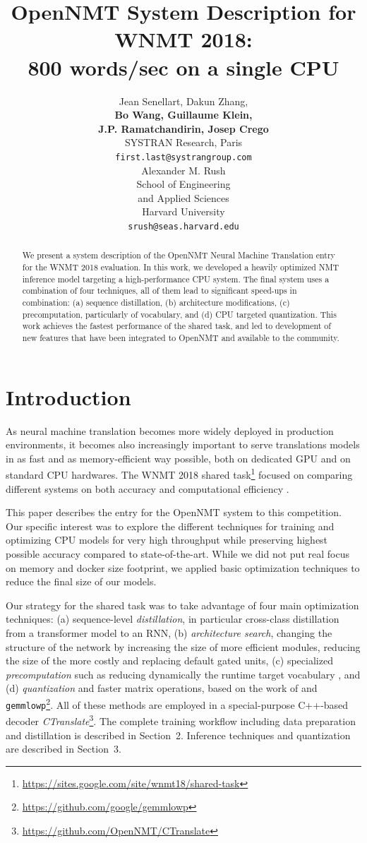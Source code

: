 \documentclass[11pt,a4paper]{article}
\title{OpenNMT System Description for WNMT 2018: \protect\\ 800 words/sec on a single CPU}
\author{Jean Senellart, Dakun Zhang, \\{\bf Bo Wang, Guillaume Klein,} \\{\bf J.P. Ramatchandirin, Josep Crego}\\
  SYSTRAN Research, Paris\\
  {\tt first.last@systrangroup.com} \\\And
  Alexander M. Rush\\
  School of Engineering \\
  and Applied Sciences \\
  Harvard University \\
  {\tt srush@seas.harvard.edu} \\}
\date{}
\begin{document}
\maketitle
\begin{abstract}

  We present a system description of the OpenNMT Neural Machine Translation entry for the WNMT 2018 evaluation.
  In this work, we developed a heavily optimized NMT inference model
  targeting a high-performance CPU system. The final system uses a
  combination of four techniques, all of them lead to significant
  speed-ups in combination: (a) sequence distillation, (b)
  architecture modifications, (c) precomputation, particularly of
  vocabulary, and (d) CPU targeted quantization. This work achieves the fastest performance of the shared task, and led to development of new features that have been integrated to OpenNMT and
  available to the community.

\end{abstract}

\section{Introduction}

As neural machine translation becomes more widely deployed in
production environments, it becomes also increasingly important to serve
translations models in as fast and as memory-efficient way possible,
both on dedicated GPU and on standard CPU hardwares. The
WNMT 2018 shared task\footnote{\url{https://sites.google.com/site/wnmt18/shared-task}}
focused on comparing different systems on both accuracy and
computational efficiency \cite{birch2018wnmt}.

This paper describes the entry for the OpenNMT system to this
competition.  Our specific interest was to explore the different
techniques for training and optimizing CPU models for very high throughput
while preserving highest possible accuracy compared to state-of-the-art. While we did not put real focus
on memory and docker size footprint, we applied basic optimization
techniques to reduce the final size of our models.

Our strategy for the shared task was to take advantage of four main
optimization techniques: (a) sequence-level \textit{distillation}, in
particular cross-class distillation from a transformer model
\cite{vaswani2017attention} to an RNN, (b) \textit{architecture
  search}, changing the structure of the network by increasing the
size of more efficient modules, reducing the size of the more costly
and replacing default gated units,  (c)
specialized \textit{precomputation} such as reducing dynamically the
runtime target vocabulary \cite{shi2017speeding}, and (d) \textit{quantization} and
faster matrix operations, based on the work of
 and {\tt
  gemmlowp}\footnote{\url{https://github.com/google/gemmlowp}}. All of these
methods are employed in a special-purpose C++-based decoder
\textit{CTranslate}\footnote{\url{https://github.com/OpenNMT/CTranslate}}.
The complete training workflow including data preparation and
distillation is described in Section~2. Inference techniques and quantization are
described in Section~3.
\end{document}
